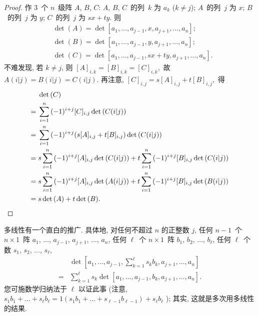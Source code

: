 \documentclass[../libro.tex]{subfiles}
\begin{document}
\begin{proof}
    作 \(3\)~个 \(n\)~级阵 \(A\), \(B\), \(C\):
    \(A\), \(B\), \(C\)~的列~\(k\) 为 \(a_k\) (\(k \neq j\));
    \(A\)~的列~\(j\) 为 \(x\);
    \(B\)~的列~\(j\) 为 \(y\);
    \(C\)~的列~\(j\) 为 \(sx + ty\).
    则
    \begin{align*}
        & \det {(A)}
        = \det
        {[a_1, \dots, a_{j-1}, x, a_{j+1}, \dots, a_n]};
        \\
        & \det {(B)}
        = \det
        {[a_1, \dots, a_{j-1}, y, a_{j+1}, \dots, a_n]};
        \\
        & \det {(C)}
        = \det
        {[a_1, \dots, a_{j-1}, sx + ty, a_{j+1}, \dots, a_n]}.
    \end{align*}
    不难发现, 若 \(k \neq j\), 则
    \(
        [A]_{i,k} = [B]_{i,k} = [C]_{i,k},
    \)
    故
    \(
        A(i|j) = B(i|j) = C(i|j).
    \)
    再注意,
    \(
        [C]_{i,j} = s[A]_{i,j} + t[B]_{i,j},
    \)
    得
    \begin{align*}
        & \det {(C)}
        \\
        = {} &
        \sum_{i = 1}^{n} {
            (-1)^{i+j} [C]_{i,j} \det {(C(i|j))}
        }
        \\
        = {} &
        \sum_{i = 1}^{n} {
            (-1)^{i+j} (s[A]_{i,j} + t[B]_{i,j}) \det {(C(i|j))}
        }
        \\
        = {} &
        s\sum_{i = 1}^{n} {
            (-1)^{i+j} [A]_{i,j} \det {(C(i|j))}
        }
        +
        t\sum_{i = 1}^{n} {
            (-1)^{i+j} [B]_{i,j} \det {(C(i|j))}
        }
        \\
        = {} &
        s\sum_{i = 1}^{n} {
            (-1)^{i+j} [A]_{i,j} \det {(A(i|j))}
        }
        +
        t\sum_{i = 1}^{n} {
            (-1)^{i+j} [B]_{i,j} \det {(B(i|j))}
        }
        \\
        = {} &
        s \det{(A)} + t \det{(B)}.
        \qedhere
    \end{align*}
\end{proof}

多线性有一个直白的推广.
具体地,
对任何不超过 \(n\) 的正整数 \(j\),
任何 \(n-1\)~个 \(n \times 1\)~阵
\(a_1\), \(\dots\), \(a_{j-1}\),
\(a_{j+1}\), \(\dots\), \(a_n\),
任何 \(\ell\)~个 \(n \times 1\)~阵
\(b_1\), \(b_2\), \(\dots\), \(b_\ell\),
任何 \(\ell\)~个数
\(s_1\), \(s_2\), \(\dots\), \(s_\ell\),
\begin{align*}
    & \det
    {\left[
            a_1, \dots, a_{j-1},
            \sum_{k = 1}^{\ell} {s_k b_k},
            a_{j+1}, \dots, a_n
    \right]}
    \\
    = {} &
    \sum_{k = 1}^{\ell}
    {s_k
        \det {[a_1, \dots, a_{j-1},
                b_k,
    a_{j+1}, \dots, a_n]}}.
\end{align*}
您可施数学归纳法于 \(\ell\) 以证此事
(注意, %
\(
    s_1 b_1 + \dots + s_\ell b_\ell
    = 1 (s_1 b_1 + \dots + s_{\ell-1} b_{\ell-1}) + s_\ell b_\ell
\)%
); %
其实, 这就是多次用多线性的结果.
\end{document}
